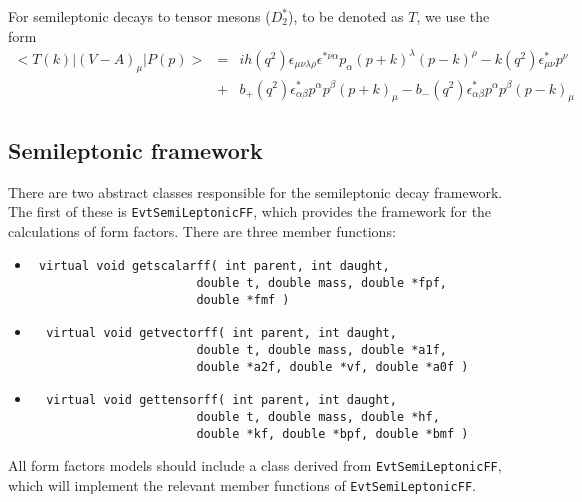 \documentclass[6pt]{article}
\begin{document}
\noindent For semileptonic decays to tensor mesons ($D_2^*$), to
be denoted as $T$, we use the form
\begin{eqnarray}
<T(k) \vert (V-A)_{\mu} \vert P(p) > &=& ih(q^2) \epsilon_{\mu \nu \lambda \rho}
\epsilon^{* \nu \alpha} p_{\alpha} (p+k)^{\lambda} (p-k)^{\rho} -
k(q^2) \epsilon^{*}_{\mu \nu} p^{\nu} \\
& + &b_+(q^2) \epsilon^*_{\alpha \beta} p^{\alpha} p^{\beta} (p+k)_{\mu} -
b_-(q^2) \epsilon^*_{\alpha \beta} p^{\alpha} p^{\beta} (p-k)_{\mu} 
\nonumber
\end{eqnarray}

\subsection{Semileptonic framework}
\label{sec:framework}
There are two abstract classes responsible for the semileptonic decay
framework.  The first of these is 
{\tt EvtSemiLeptonicFF}, which 
provides the framework for the calculations of form factors.  There
are three member functions:
\begin{itemize}
\item \begin{verbatim} virtual void getscalarff( int parent, int daught,
                       double t, double mass, double *fpf,
                       double *fmf ) 
\end{verbatim}
\item \begin{verbatim}  virtual void getvectorff( int parent, int daught,
                       double t, double mass, double *a1f,
                       double *a2f, double *vf, double *a0f ) 
\end{verbatim}
\item \begin{verbatim}  virtual void gettensorff( int parent, int daught,
                       double t, double mass, double *hf,
                       double *kf, double *bpf, double *bmf ) 
\end{verbatim}
\end{itemize}
\noindent All form factors models should include a class 
derived from {\tt EvtSemiLeptonicFF},  which
will implement the relevant member functions of
{\tt EvtSemiLeptonicFF}. 
\end{document}
